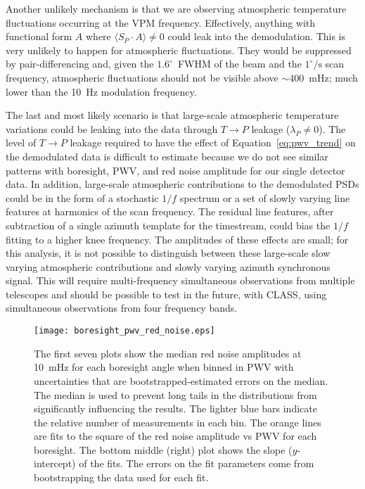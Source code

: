 \documentclass[twocolumn, tighten, numberedappendix, twocolappendix]{aastex63}
\begin{document}
Another unlikely mechanism is that we are observing atmospheric temperature fluctuations occurring at the VPM frequency. Effectively, anything with functional form $A$ where $\langle S_P \cdot A\rangle \neq 0$ could leak into the demodulation. This is very unlikely to happen for atmospheric fluctuations. They would be suppressed by pair-differencing and, given the $1.6^\circ$~FWHM of the beam and the $1^\circ/\text{s}$ scan frequency, atmospheric fluctuations should not be visible above $\sim400$~mHz; much lower than the 10~Hz modulation frequency. 

The last and most likely scenario is that large-scale atmospheric temperature variations could be leaking into the data through $T \rightarrow P$ leakage ($\lambda_P \neq 0$). The level of $T\rightarrow P$ leakage required to have the effect of Equation~\ref{eq:pwv_trend} on the demodulated data is difficult to estimate because we do not see similar patterns with boresight, PWV, and red noise amplitude for our single detector data. In addition, large-scale atmospheric contributions to the demodulated PSDs could be in the form of a stochastic $1/f$ spectrum or a set of slowly varying line features at harmonics of the scan frequency. The residual line features, after subtraction of a single azimuth template for the timestream, could bias the $1/f$ fitting to a higher knee frequency. The amplitudes of these effects are small; for this analysis, it is not possible to distinguish between these large-scale slow varying atmospheric contributions and slowly varying azimuth synchronous signal. This will require multi-frequency simultaneous observations from multiple telescopes and should be possible to test in the future, with CLASS, using simultaneous observations from four frequency bands. 

\begin{figure*}
    \centering
    \texttt{[image: boresight\_pwv\_red\_noise.eps]}
    \caption{The first seven plots show the median red noise amplitudes at 10~mHz for each boresight angle when binned in PWV with uncertainties that are bootstrapped-estimated errors on the median. The median is used to prevent long tails in the distributions from significantly influencing the results. The lighter blue bars indicate the relative number of measurements in each bin. The orange lines are fits to the square of the red noise amplitude vs PWV for each boresight. The bottom middle (right) plot shows the slope ($y$-intercept) of the fits. The errors on the fit parameters come from bootstrapping the data used for each fit.}
    \label{fig:pwv_bore_trends}
\end{figure*}
\end{document}
